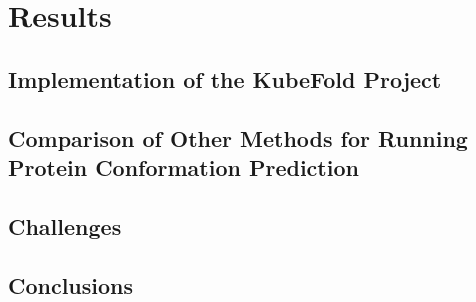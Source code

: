 \chapter{Results}


\section{Implementation of the KubeFold Project}


\section{Comparison of Other Methods for Running Protein Conformation Prediction}


\section{Challenges}


\section{Conclusions}